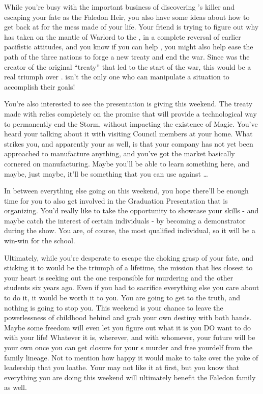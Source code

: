 \documentclass[char]{GL2020}
\begin{document}
While you’re busy with the important business of discovering \cHeirSibling{}’s killer and escaping your fate as the Faledon Heir, you also have some ideas about how to get back at \cDiplomat{} for the mess \cDiplomat{\they} \cDiplomat{\have} made of your life. Your friend \cWarlordDaughter{} is trying to figure out why \cWarlordDaughter{\their} \cLoud{\parent} has taken on the mantle of Warlord to the \pShippies{}, in a complete reversal of \cLoud{\their} earlier pacifistic attitudes, and you know if you can help \cWarlordDaughter{}, you might also help ease the path of the three nations to forge a new treaty and end the war. Since \cDiplomat{} was the creator of the original ``treaty'' that led to the start of the war, this would be a real triumph over \cDiplomat{\them}. \cDiplomat{} isn’t the only one who can manipulate a situation to accomplish their goals!  

You’re also interested to see the presentation \cHeadScientist{} is giving this weekend.  The treaty \cDiplomat{} made with \pFarm{} relies completely on the promise that \pTech{} will provide a technological way to permanently end the Storm, without impacting the existence of Magic. You’ve heard your \cFaledonParent{\parent} talking about it with visiting Council members at your home.  What strikes you, and apparently your \cFaledonParent{\parent} as well, is that your company has not yet been approached to manufacture anything, and you’ve got the market basically cornered on manufacturing. Maybe you’ll be able to learn something here, and maybe, just maybe, it’ll be something that you can use against \cDiplomat{}\ldots

In between everything else going on this weekend, you hope there’ll be enough time for you to also get involved in the Graduation Presentation that \cMusic{} is organizing. You’d really like to take the opportunity to showcase your skills - and maybe catch the interest of certain individuals - by becoming a demonstrator during the show. You are, of course, the most qualified individual, so it will be a win-win for the school.

Ultimately, while you’re desperate to escape the choking grasp of your fate, and sticking it to \cDiplomat{} would be the triumph of a lifetime, the mission that lies closest to your heart is seeking out the one responsible for murdering \cHeirSibling{} and the other students six years ago. Even if you had to sacrifice everything else you care about to do it, it would be worth it to you. You are going to get to the truth, and nothing is going to stop you. This weekend is your chance to leave the powerlessness of childhood behind and grab your own destiny with both hands. Maybe some freedom will even let you figure out what it is you DO want to do with your life! Whatever it is, wherever, and with whomever, your future will be your own once you can get closure for your \cHeirSibling{\sibling}s murder and free yourdelf from the family lineage. Not to mention how happy it would make \cAmbition{} to take over the yoke of leadership that you loathe. Your \cFaledonParent{\parent} may not like it at first, but you know that everything you are doing this weekend will ultimately benefit the Faledon family as well.
\end{document}
